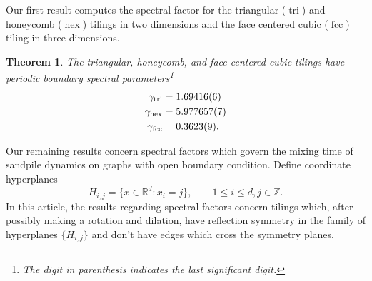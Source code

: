 \documentclass[a4paper, 12pt, notitlepage]{amsart}
\newcommand{\tri}{\operatorname{tri}}
\newcommand{\hex}{\operatorname{hex}}
\newcommand{\dice}{\operatorname{dice}}
\newcommand{\fcc}{\operatorname{fcc}}
\newcommand{\bR}{\mathbb{R}}
\newcommand{\zed}{\mathbb{Z}}
\newtheorem{theorem}{Theorem}
\theoremstyle{remark}
\begin{document}
Our first result computes the spectral factor for the triangular ($\tri$) and honeycomb ($\hex$) tilings in two dimensions and the face centered cubic ($\fcc$) tiling in three dimensions.  



\begin{theorem}\label{spectral_gap_calc_theorem}
  The triangular, honeycomb, %
 and face centered cubic tilings have periodic boundary spectral parameters\footnote{The digit in parenthesis indicates the last significant digit.}
 \begin{align*}
 \gamma_{\tri} &= 1.69416(6)\\
 \notag \gamma_{\hex} &= 5.977657(7)\\
 \notag \gamma_{\fcc} &= 0.3623(9).
 \end{align*}
\end{theorem}

Our remaining results concern spectral factors which govern the mixing time of sandpile dynamics on graphs with open boundary condition.  Define coordinate hyperplanes
\[
 H_{i,j} = \{x \in \bR^d: x_i = j\}, \qquad 1 \leq i \leq d, j \in \zed.
\]
In this article, the results regarding spectral factors concern tilings which, after possibly making a rotation and dilation, have reflection symmetry in the family of hyperplanes $\{H_{i,j}\}$ and don't have edges which cross the symmetry planes.  
\end{document}
